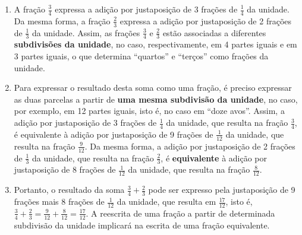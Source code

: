 \begin{enumerate} [\quad a)] %
    \item       A fração       $\frac{3}{4}$       expressa a adição por justaposição de 3 frações de       $\frac{1}{4}$       da unidade. Da mesma forma, a fração       $\frac{2}{3}$        expressa a adição por justaposição de 2 frações de       $\frac{1}{3}$       da unidade. Assim, as frações       $\frac{3}{4}$       e       $\frac{2}{3}$       estão associadas a diferentes       {\bf subdivisões da unidade}, no caso, respectivamente, em 4 partes iguais e em 3 partes iguais, o que determina       ``quartos''       e       ``terços''       como frações da unidade.
    \item       Para expressar o resultado desta soma como uma fração, é preciso expressar as duas parcelas a partir de       {\bf uma mesma subdivisão da unidade}, no caso, por exemplo, em 12 partes iguais, isto é, no caso em       ``doze avos''. Assim, a adição por justaposição de 3 frações de       $\frac{1}{4}$       da unidade, que resulta na fração       $\frac{3}{4}$, é equivalente à adição por justaposição de 9 frações de       $\frac{1}{12}$       da unidade, que resulta na fração       $\frac{9}{12}$. Da mesma forma, a adição por justaposição de 2 frações de       $\frac{1}{3}$       da unidade, que resulta na fração       $\frac{2}{3}$, é       {\bf equivalente}       à adição por justaposição de 8 frações de       $\frac{1}{12}$       da unidade, que resulta na fração       $\frac{8}{12}$.
    \item       Portanto, o resultado da soma       $\frac{3}{4} + \frac{2}{3}$       pode ser expresso pela justaposição de 9 frações mais 8 frações de       $\frac{1}{12}$       da unidade, que resulta em       $\frac{17}{12}$, isto é,       $\frac{3}{4} + \frac{2}{3} = \frac{9}{12}+\frac{8}{12}=\frac{17}{12}$. A reescrita de uma fração a partir de determinada subdivisão da unidade implicará na escrita de uma fração equivalente.
\end{enumerate} %

